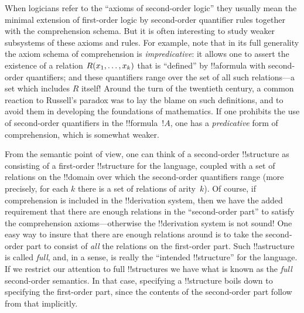 \documentclass[../../../include/open-logic-section]{subfiles}
\begin{document}
When logicians refer to the ``axioms of second-order logic'' they
usually mean the minimal extension of first-order logic by
second-order quantifier rules together with the comprehension
schema. But it is often interesting to study weaker subsystems of
these axioms and rules. For example, note that in its full generality
the axiom schema of comprehension is \emph{impredicative}: it allows
one to assert the existence of a relation $\mathord{R}(x_1, \dots, x_k)$
that is ``defined'' by !!a{formula} with second-order quantifiers; and
these quantifiers range over the set of all such relations---a set
which includes $R$ itself!{} Around the turn of the twentieth century, a
common reaction to Russell's paradox was to lay the blame on such
definitions, and to avoid them in developing the foundations of
mathematics. If one prohibits the use of second-order quantifiers in
the !!{formula}~$!A$, one has a {\em predicative} form of
comprehension, which is somewhat weaker.

From the semantic point of view, one can think of a second-order
!!{structure} as consisting of a first-order !!{structure} for the
language, coupled with a set of relations on the !!{domain} over which
the second-order quantifiers range (more precisely, for each $k$ there
is a set of relations of arity~$k$). Of course, if comprehension is
included in the !!{derivation} system, then we have the added requirement that
there are enough relations in the ``second-order part'' to satisfy the
comprehension axioms---otherwise the !!{derivation} system is not sound!{} One
easy way to insure that there are enough relations around is to take
the second-order part to consist of \emph{all} the relations on the
first-order part. Such !!a{structure} is called \emph{full}, and, in a
sense, is really the ``intended !!{structure}'' for the language. If
we restrict our attention to full !!{structure}s we have what is known
as the \emph{full} second-order semantics. In that case, specifying a
!!{structure} boils down to specifying the first-order part, since the
contents of the second-order part follow from that implicitly.
\end{document}
